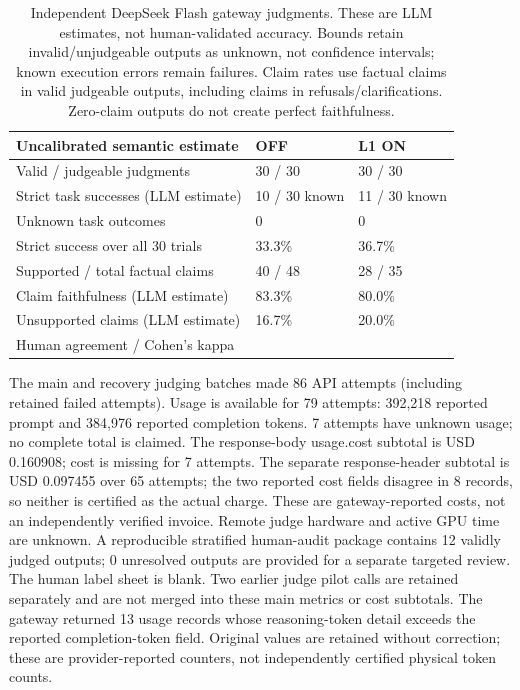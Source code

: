 \begin{table}[H]\centering\footnotesize
\begin{tabularx}{\textwidth}{@{}L{6.0cm}XX@{}}\toprule Uncalibrated semantic estimate & OFF & L1 ON\\\midrule
Valid / judgeable judgments & 30 / 30 & 30 / 30\\
Strict task successes (LLM estimate) & 10 / 30 known & 11 / 30 known\\
Unknown task outcomes & 0 & 0\\
Strict success over all 30 trials & 33.3\% & 36.7\%\\
Supported / total factual claims & 40 / 48 & 28 / 35\\
Claim faithfulness (LLM estimate) & 83.3\% & 80.0\%\\
Unsupported claims (LLM estimate) & 16.7\% & 20.0\%\\
Human agreement / Cohen's kappa &  & \\
\bottomrule\end{tabularx}
\caption{Independent DeepSeek Flash gateway judgments. These are LLM estimates, not human-validated accuracy. Bounds retain invalid/unjudgeable outputs as unknown, not confidence intervals; known execution errors remain failures. Claim rates use factual claims in valid judgeable outputs, including claims in refusals/clarifications. Zero-claim outputs do not create perfect faithfulness.}
\end{table}
The main and recovery judging batches made 86 API attempts (including retained failed attempts). Usage is available for 79 attempts: 392,218 reported prompt and 384,976 reported completion tokens. 7 attempts have unknown usage; no complete total is claimed. The response-body usage.cost subtotal is USD 0.160908; cost is missing for 7 attempts. The separate response-header subtotal is USD 0.097455 over 65 attempts; the two reported cost fields disagree in 8 records, so neither is certified as the actual charge. These are gateway-reported costs, not an independently verified invoice. Remote judge hardware and active GPU time are unknown. A reproducible stratified human-audit package contains 12 validly judged outputs; 0 unresolved outputs are provided for a separate targeted review. The human label sheet is blank. 
Two earlier judge pilot calls are retained separately and are not merged into these main metrics or cost subtotals.
The gateway returned 13 usage records whose reasoning-token detail exceeds the reported completion-token field. Original values are retained without correction; these are provider-reported counters, not independently certified physical token counts.
